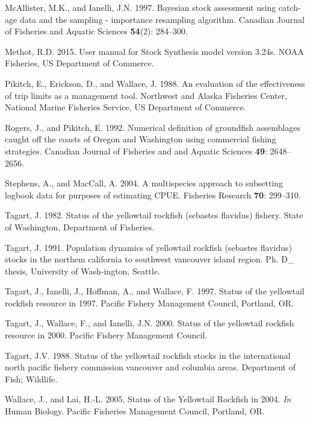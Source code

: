 \documentclass[12pt,]{article}
\begin{document}
\hypertarget{ref-McAllister1997}{}
McAllister, M.K., and Ianelli, J.N. 1997. Bayesian stock assessment
using catch-age data and the sampling - importance resampling algorithm.
Canadian Journal of Fisheries and Aquatic Sciences \textbf{54}(2):
284--300.

\hypertarget{ref-Methot2015}{}
Methot, R.D. 2015. User manual for Stock Synthesis model version 3.24s.
NOAA Fisheries, US Department of Commerce.

\hypertarget{ref-Pikitch1988}{}
Pikitch, E., Erickson, D., and Wallace, J. 1988. An evaluation of the
effectiveness of trip limits as a management tool. Northwest and Alaska
Fisheries Center, National Marine Fisheries Service, US Department of
Commerce.

\hypertarget{ref-Rogers1992}{}
Rogers, J., and Pikitch, E. 1992. Numerical definition of groundfish
assemblages caught off the coasts of Oregon and Washington using
commercial fishing strategies. Canadian Journal of Fisheries and and
Aquatic Sciences \textbf{49}: 2648--2656.

\hypertarget{ref-Stephens2004}{}
Stephens, A., and MacCall, A. 2004. A multispecies approach to
subsetting logbook data for purposes of estimating CPUE. Fisheries
Research \textbf{70}: 299--310.

\hypertarget{ref-Tagart1982}{}
Tagart, J. 1982. Status of the yellowtail rockfish (sebastes flavidus)
fishery. State of Washington, Department of Fisheries.

\hypertarget{ref-Tagart1991}{}
Tagart, J. 1991. Population dynamics of yellowtail rockfish (sebastes
flavidus) stocks in the northem california to southwest vancouver island
region. Ph. D\_ thesis, University of Wash-ington, Seattle.

\hypertarget{ref-Tagart1997}{}
Tagart, J., Ianelli, J., Hoffman, A., and Wallace, F. 1997. Status of
the yellowtail rockfish resource in 1997. Pacific Fishery Management
Council, Portland, OR.

\hypertarget{ref-Tagart2000}{}
Tagart, J., Wallace, F., and Ianelli, J.N. 2000. Status of the
yellowtail rockfish resource in 2000. Pacific Fishery Management
Council.

\hypertarget{ref-Tagart1988}{}
Tagart, J.V. 1988. Status of the yellowtail rockfish stocks in the
international north pacific fishery commission vancouver and columbia
areas. Department of Fish; Wildlife.

\hypertarget{ref-Wallace2005}{}
Wallace, J., and Lai, H.-L. 2005. Status of the Yellowtail Rockfish in
2004. \emph{In} Human Biology. Pacific Fisheries Management Council,
Portland, OR.
\end{document}
